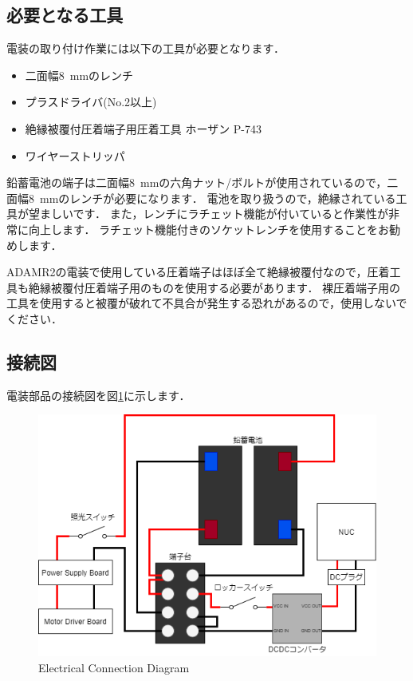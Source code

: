 \documentclass[{../../master}]{subfiles}
\begin{document}
  \subsection{必要となる工具}

  電装の取り付け作業には以下の工具が必要となります．

  \begin{itemize}
    \item 二面幅\SI{8}{mm}のレンチ
    \item プラスドライバ(No.2以上)
    \item 絶縁被覆付圧着端子用圧着工具 ホーザン P-743
    \item ワイヤーストリッパ
  \end{itemize}
  
  鉛蓄電池の端子は二面幅\SI{8}{mm}の六角ナット/ボルトが使用されているので，二面幅\SI{8}{mm}のレンチが必要になります．
  電池を取り扱うので，絶縁されている工具が望ましいです．
  また，レンチにラチェット機能が付いていると作業性が非常に向上します．
  ラチェット機能付きのソケットレンチを使用することをお勧めします．

  ADAMR2の電装で使用している圧着端子はほぼ全て絶縁被覆付なので，圧着工具も絶縁被覆付圧着端子用のものを使用する必要があります．
  裸圧着端子用の工具を使用すると被覆が破れて不具合が発生する恐れがあるので，使用しないでください．

  \subsection{接続図}

  電装部品の接続図を図\ref{fig:electrical_connection_diagram}に示します．

  \begin{figure}[ht]
    \centering
    \includegraphics[width=100truemm, clip]{images/electrical_connections.png}
    \caption{Electrical Connection Diagram}
    \label{fig:electrical_connection_diagram}
  \end{figure}
\end{document}
